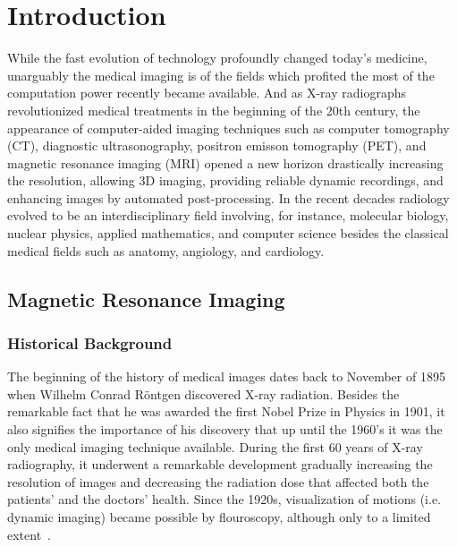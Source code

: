 \chapter{Introduction}

While the fast evolution of technology profoundly changed today's medicine, unarguably the medical imaging is of the fields which profited the most of the computation power recently became available. And as X-ray radiographs revolutionized medical treatments in the beginning of the 20th century,  the appearance of computer-aided imaging techniques such as computer tomography (CT), diagnostic ultrasonography, positron emisson tomography (PET), and magnetic resonance imaging (MRI) opened a new horizon drastically increasing the resolution, allowing 3D imaging, providing reliable dynamic recordings, and enhancing images by automated post-processing. In the recent decades radiology evolved to be an interdisciplinary field involving, for instance, molecular biology, nuclear physics, applied mathematics, and computer science besides the classical medical fields such as anatomy, angiology, and cardiology.

\section{Magnetic Resonance Imaging}
\subsection{Historical Background}
The beginning of the history of medical images dates back to November of 1895 when Wilhelm Conrad Röntgen discovered X-ray radiation. Besides the remarkable fact that he was awarded the first Nobel Prize in Physics in 1901, it also signifies the importance of his discovery that up until the 1960's it was the only medical imaging technique available. During the first 60 years of X-ray radiography, it underwent a remarkable development gradually increasing the resolution of images and decreasing the radiation dose that affected both the patients' and the doctors' health. Since the 1920s, visualization of motions (i.e. dynamic imaging) became possible by flouroscopy, although only to a limited extent~\cite{bradley_history_2008}.

